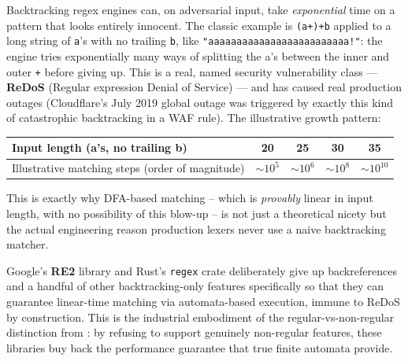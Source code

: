 \documentclass[full-course-notes.tex]{subfiles}
\begin{document}
\begin{enrichment}
Backtracking regex engines can, on adversarial input, take \emph{exponential} time on a pattern
that looks entirely innocent. The classic example is \verb|(a+)+b| applied to a long string of
\texttt{a}'s with no trailing \texttt{b}, like \texttt{"aaaaaaaaaaaaaaaaaaaaaaaaa!"}: the engine
tries exponentially many ways of splitting the a's between the inner and outer \texttt{+} before
giving up. This is a real, named security vulnerability class --- \textbf{ReDoS} (Regular
expression Denial of Service) --- and has caused real production outages (Cloudflare's July 2019
global outage was triggered by exactly this kind of catastrophic backtracking in a WAF rule).
The illustrative growth pattern:
\begin{center}
\small
\begin{tabular}{@{}lcccc@{}}
\toprule
Input length (a's, no trailing b) & 20 & 25 & 30 & 35 \\
\midrule
Illustrative matching steps (order of magnitude) & $\sim 10^5$ & $\sim 10^6$ & $\sim 10^8$ & $\sim 10^{10}$ \\
\bottomrule
\end{tabular}
\end{center}
This is exactly why DFA-based matching -- which is \emph{provably} linear in input length, with
no possibility of this blow-up -- is not just a theoretical nicety but the actual engineering
reason production lexers never use a naive backtracking matcher.
\end{enrichment}

\begin{enrichment}
Google's \textbf{RE2} library and Rust's \texttt{regex} crate deliberately give up
backreferences and a handful of other backtracking-only features specifically so that they can
guarantee linear-time matching via automata-based execution, immune to ReDoS by construction.
This is the industrial embodiment of the regular-vs-non-regular distinction from
: by refusing to support genuinely non-regular features,
these libraries buy back the performance guarantee that true finite automata provide.
\end{enrichment}
\end{document}
